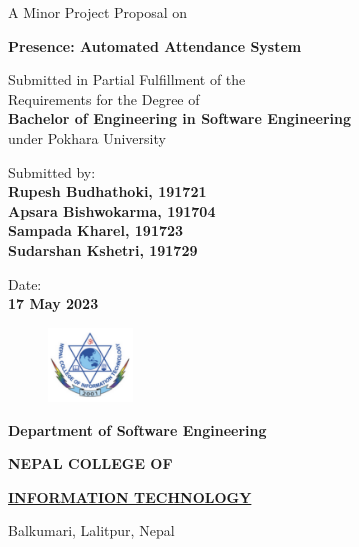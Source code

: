 \documentclass[12pt]{article}
\begin{document}
\begin{titlepage}
	\begin{center}
	
	\large%
	A Minor Project Proposal on
	
	\huge %
	\textbf{Presence: Automated Attendance System}

	\vfill
	
	\large %
	Submitted in Partial Fulfillment of the \\ 
	Requirements for the Degree of \\ 
	\textbf {Bachelor of Engineering in Software Engineering} \\
	under Pokhara University
	
	\vfill
	
	Submitted by: \\ 
	\textbf {Rupesh Budhathoki, 191721} \\
	\textbf {Apsara Bishwokarma, 191704} \\
	\textbf {Sampada Kharel, 191723} \\
	\textbf {Sudarshan Kshetri, 191729} \\
 
	\vfill
	
	
	
	Date: \\
	\textbf {17 May 2023}
	
	\vfill
	
	\end{center}
	
	\begin{figure}
	\centering
	\includegraphics[width=0.2\textwidth]{figures/college-logo.png}
	\end{figure}
	
	\selectfont
	
	\textbf {Department of Software Engineering}  
	
        \LARGE %
	\textbf {NEPAL COLLEGE OF} 
	
	\LARGE %
	\textbf {\underline {INFORMATION TECHNOLOGY} }
	
	\small %
	Balkumari, Lalitpur, Nepal
	
	
\end{titlepage}
\end{document}
